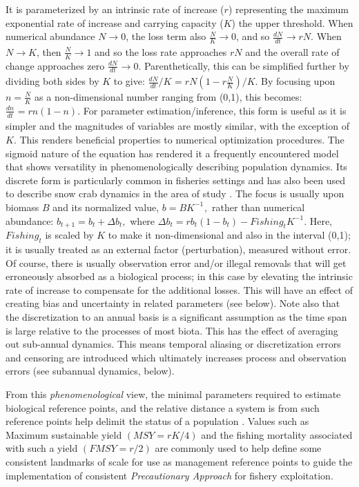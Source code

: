 \documentclass[
	letterpaper, %
	10pt, %
]{article}
\begin{document}
It is parameterized by an intrinsic rate of increase ($r$) representing
the maximum exponential rate of increase and carrying capacity ($K$)
the upper threshold. When numerical abundance 
$N\rightarrow0$, the loss term also 
$\frac{N}{K}\rightarrow0$, and so 
$\frac{\mathit{dN}}{\mathit{dt}}_{}\rightarrow\mathit{rN}$. When 
$N\rightarrow K$, then 
$\frac{N}{K}\rightarrow1$ and so the loss rate approaches 
$\mathit{rN}$ and the overall rate of change approaches zero 
${\frac{\mathit{dN}}{\mathit{dt}}_{}\rightarrow0}{}$.
Parenthetically, this can be simplified further by dividing both sides
by $K$ to give: 
${{\frac{\mathit{dN}}{\mathit{dt}}/K}_{}=\mathit{rN}}{{({{1-r}\frac{N}{K}})}/K}.$ By focusing upon 
$n=\frac{N}{K}$ as a non-dimensional number ranging from (0,1), this becomes: ${\frac{\mathit{dn}}{\mathit{dt}}_{}=\mathit{rn}}{({1-n})}$. For parameter estimation/inference, this form is useful as it is simpler and the magnitudes of variables are mostly similar, with the exception of 
$K$. This renders beneficial properties to numerical optimization procedures. 
The sigmoid nature of the equation has rendered it a frequently encountered
model that shows versatility in phenomenologically describing population
dynamics. Its discrete form is particularly common in fisheries settings
\cite{Schaefer_1954, Meyer_Millar_1999} and
has also been used to describe snow crab dynamics in the area of study
\cite{Choi_Zisserson_2011}. The focus is usually upon biomass 
$B$ and its normalized value, ${{b=B}K^{-1}}_{},$ rather than numerical abundance: ${b_{t+1}={b_{t}+\Delta}}b_{t},$ where $\Delta b_{t} = rb_{t}{({1-b_{t}})}-\mathit{Fishing}_{t}K^{-1}.$ Here, $\mathit{Fishing}_{t}$ is scaled by 
$K$ to make it non-dimensional and also in the interval (0,1); it is usually
treated as an external factor (perturbation), measured without error.
Of course, there is usually observation error and/or illegal removals
that will get erroneously absorbed as a biological process; in this case by elevating
the intrinsic rate of increase to compensate for the additional losses.
This will have an effect of creating bias and uncertainty in related
parameters (see below). Note also that the discretization to an annual basis is a significant assumption as the time span is large relative to the processes of most biota.
This has the effect of averaging out sub-annual dynamics. This means
temporal aliasing or discretization errors and censoring are introduced
which ultimately increases process and observation errors (see subannual
dynamics, below).

From this \emph{phenomenological} view, the minimal parameters required
to estimate biological reference points, and the relative distance
a system is from such reference points help delimit the status of
a population \cite{Schaefer_1954, Meyer_Millar_1999}.
Values such as Maximum sustainable yield 
$\left({\mathit{MSY}={\mathit{rK}/4}}\right)$ and the fishing mortality associated with such a yield 
$\left({\mathit{FMSY}={r/2}}\right)$ are commonly used to help define some consistent landmarks of scale
for use as management reference points to guide the implementation
of consistent \emph{Precautionary Approach} for fishery exploitation.
\end{document}
